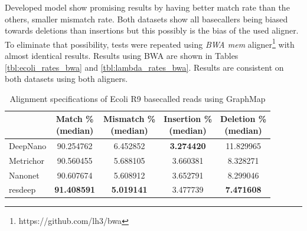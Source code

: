 \documentclass[times, utf8, diplomski, numeric, english]{fer}
\begin{document}
Developed model show promising results by having better match rate than the others, smaller mismatch rate. Both datasets show all basecallers being biased towards deletions than insertions but this possibly is the bias of the used aligner. To eliminate that possibility, tests were repeated using \textit{BWA mem} aligner\footnote{https://github.com/lh3/bwa} with almost identical results. Results using BWA are shown in Tables
\ref{tbl:ecoli_rates_bwa} and \ref{tbl:lambda_rates_bwa}. Results are consistent on both datasets using both aligners.



\begin{table}[htb]
	\caption{Alignment specifications of Ecoli R9 basecalled reads using GraphMap}
	\label{tbl:ecoli_rates}
	\centering
	\begin{tabular}{lcccc}
		\toprule
		{} &  \thead{Match \% \\(median)} &  \thead{Mismatch \% \\(median)} &  \thead{Insertion \% \\(median)} &  \thead{Deletion \% \\(median)} \\
		\midrule
		
		DeepNano   &                  90.254762 &                      6.452852 &                       \textbf{3.274420} &                     11.829965 \\
		Metrichor  &                  90.560455 &                      5.688105 &                       3.660381 &                      8.328271 \\
		Nanonet    &                  90.607674 &                      5.608912 &                       3.652791 &                      8.299046 \\
		resdeep    &                  \textbf{91.408591} &                     \textbf{ 5.019141} &                       3.477739 &                      \textbf{7.471608 }\\
		\bottomrule
	\end{tabular}
\end{table}
\end{document}
